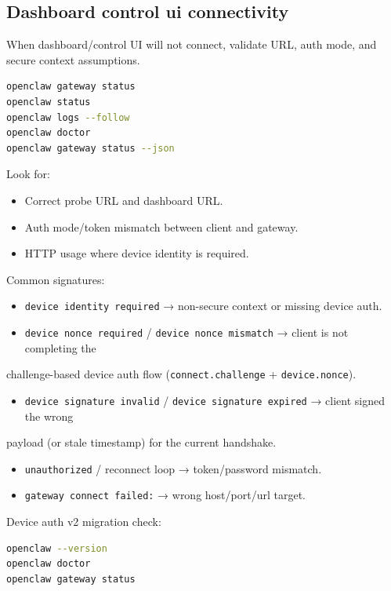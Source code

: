 \subsection{Dashboard control ui connectivity}


When dashboard/control UI will not connect, validate URL, auth mode, and secure context assumptions.

\begin{lstlisting}[language=bash]
openclaw gateway status
openclaw status
openclaw logs --follow
openclaw doctor
openclaw gateway status --json
\end{lstlisting}


Look for:

\begin{itemize}
  \item Correct probe URL and dashboard URL.
  \item Auth mode/token mismatch between client and gateway.
  \item HTTP usage where device identity is required.
\end{itemize}


Common signatures:

\begin{itemize}
  \item \texttt{device identity required} → non-secure context or missing device auth.
  \item \texttt{device nonce required} / \texttt{device nonce mismatch} → client is not completing the
\end{itemize}

challenge-based device auth flow (\texttt{connect.challenge} + \texttt{device.nonce}).
\begin{itemize}
  \item \texttt{device signature invalid} / \texttt{device signature expired} → client signed the wrong
\end{itemize}

payload (or stale timestamp) for the current handshake.
\begin{itemize}
  \item \texttt{unauthorized} / reconnect loop → token/password mismatch.
  \item \texttt{gateway connect failed:} → wrong host/port/url target.
\end{itemize}


Device auth v2 migration check:

\begin{lstlisting}[language=bash]
openclaw --version
openclaw doctor
openclaw gateway status
\end{lstlisting}


